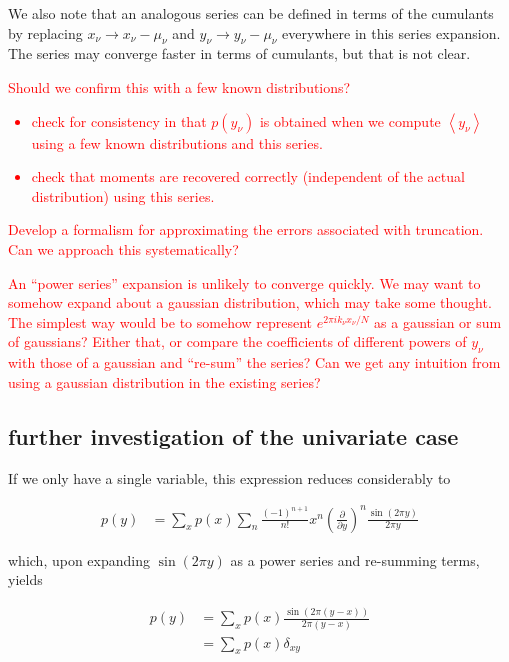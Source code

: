 \documentclass{article}
\newcommand{\e}[1]{\left<#1\right>}
\begin{document}
We also note that an analogous series can be defined in terms of the cumulants by replacing $x_\nu \rightarrow x_\nu - \mu_\nu$ and $y_\nu \rightarrow y_\nu - \mu_\nu$ everywhere in this series expansion. 
The series may converge faster in terms of cumulants, but that is not clear.

\textcolor{red}{
Should we confirm this with a few known distributions?
\begin{itemize}
	\item{check for consistency in that $p(y_\nu)$ is obtained when we compute $\e{y_\nu}$ using a few known distributions and this series.}
	\item{check that moments are recovered correctly (independent of the actual distribution) using this series.}
\end{itemize}
Develop a formalism for approximating the errors associated with truncation.
Can we approach this systematically?
}

\textcolor{red}{
An ``power series'' expansion is unlikely to converge quickly. 
We may want to somehow expand about a gaussian distribution, which may take some thought.
The simplest way would be to somehow represent $e^{2\pi i k_\nu x_\nu /N}$ as a gaussian or sum of gaussians?
Either that, or compare the coefficients of different powers of $y_\nu$ with those of a gaussian and ``re-sum'' the series?
Can we get any intuition from using a gaussian distribution in the existing series?
}

\subsection{further investigation of the univariate case}

If we only have a single variable, this expression reduces considerably to 

\begin{subequations}
	\begin{align}
		p(y) & = \sum_x p(x) \sum_n \frac{(-1)^{n+1}}{n!} x^n \left(\frac{\partial}{\partial y}\right)^n \frac{\sin(2\pi y)}{2\pi y} 
	\end{align}
\end{subequations}

\noindent
which, upon expanding $\sin(2\pi y)$ as a power series and re-summing terms, yields

\begin{subequations}
	\begin{align}
		p(y) & = \sum_x p(x) \frac{\sin(2\pi (y-x))}{2\pi (y-x)} \\
		     & = \sum_x p(x) \delta_{xy}
	\end{align}
\end{subequations}
\end{document}
